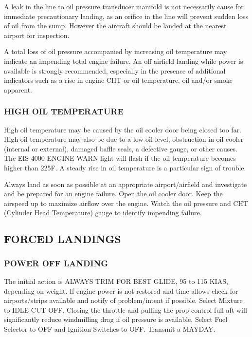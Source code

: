 A leak in the line to oil pressure transducer manifold is not
necessarily cause for immediate precautionary landing, as an orifice in the line will prevent sudden loss of oil from
the sump.  However the aircraft should be landed at the nearest airport for inspection.

A total loss of oil pressure accompanied by increasing oil temperature may indicate an impending total engine failure.
An off airfield landing while power is available is strongly recommended, especially in the presence of additional
indicators such as a rise in engine CHT or oil temperature, oil and/or smoke apparent. 

\subsubsection{HIGH OIL TEMPERATURE}

High oil temperature may be caused by the oil cooler door being closed
too far. High oil temperature may also be due to a low oil level,
obstruction in oil cooler (internal or external), damaged baffle seals,
a defective gauge, or other causes. The EIS 4000 ENGINE WARN light
will flash if the oil temperature becomes higher than 225\textdegree F. A steady
rise in oil temperature is a particular sign of trouble.

Always land as soon as possible at an appropriate airport/airfield
and investigate and be prepared for an engine failure. Open the oil
cooler door. Keep the airspeed up to maximize airflow over the engine.
Watch the oil pressure and CHT (Cylinder Head Temperature) gauge to
identify impending failure.

\subsection{FORCED LANDINGS}
\subsubsection{POWER OFF LANDING}

The initial action is ALWAYS TRIM FOR BEST GLIDE, 95 to 115 KIAS, depending
on weight. If engine power is not restored and time allows check for
airports/strips available and notify of problem/intent if possible.  
Select Mixture to IDLE CUT OFF.  
Closing the throttle and pulling the prop control full aft will significantly reduce windmilling drag if oil pressure
is available.  Select Fuel Selector to OFF and Ignition Switches to OFF. 
Transmit a MAYDAY.

